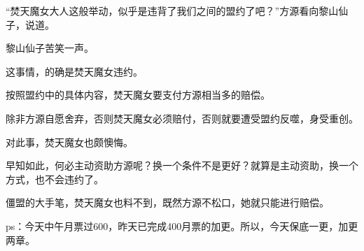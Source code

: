 \begin{this_body}
“焚天魔女大人这般举动，似乎是违背了我们之间的盟约了吧？”方源看向黎山仙子，说道。

黎山仙子苦笑一声。

这事情，的确是焚天魔女违约。

按照盟约中的具体内容，焚天魔女要支付方源相当多的赔偿。

除非方源自愿舍弃，否则焚天魔女必须赔付，否则就要遭受盟约反噬，身受重创。

对此事，焚天魔女也颇懊悔。

早知如此，何必主动资助方源呢？换一个条件不是更好？就算是主动资助，换一个方式，也不会违约了。

僵盟的大手笔，焚天魔女也料不到，既然方源不松口，她就只能进行赔偿。

ps：今天中午月票过600，昨天已完成400月票的加更。所以，今天保底一更，加更两章。

\end{this_body}

